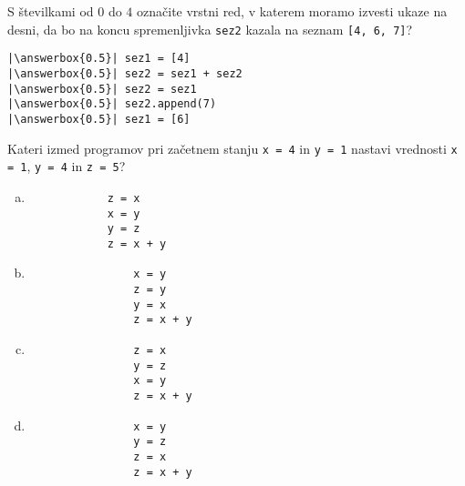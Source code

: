 \documentclass[arhiv, 10pt]{../izpit}
\newcommand{\inlinepy}[1]{\texttt{#1}}
\newcommand{\answerbox}[1]{\framebox{\vphantom{\large M}\hspace{#1cm}}}
\begin{document}
        \naloga*
        \begin{multicols}{2}
        \noindent 
        S številkami od $0$ do $4$ označite vrstni red, v katerem moramo izvesti ukaze na desni, da bo na koncu spremenljivka \inlinepy{sez2} kazala na seznam \inlinepy{[4, 6, 7]}?
    
        \columnbreak
        \noindent
        \begin{verbatim}
|\answerbox{0.5}| sez1 = [4]
|\answerbox{0.5}| sez2 = sez1 + sez2
|\answerbox{0.5}| sez2 = sez1
|\answerbox{0.5}| sez2.append(7)
|\answerbox{0.5}| sez1 = [6]

        \end{verbatim}
        \end{multicols}
    
            
        \naloga*
        
        Kateri izmed programov pri začetnem stanju
            \inlinepy{x = 4} in
            \inlinepy{y = 1}
        nastavi vrednosti
            \inlinepy{x = 1},
            \inlinepy{y = 4} in
            \inlinepy{z = 5}?
    
        \begin{multicols}{4}
        \begin{enumerate}[(a)]
\item 
            \begin{verbatim}
            z = x
            x = y
            y = z
            z = x + y
            \end{verbatim}
        
\item 
                \begin{verbatim}
                x = y
                z = y
                y = x
                z = x + y
                \end{verbatim}
            
\item 
                \begin{verbatim}
                z = x
                y = z
                x = y
                z = x + y
                \end{verbatim}
            
\item 
                \begin{verbatim}
                x = y
                y = z
                z = x
                z = x + y
                \end{verbatim}
            
\end{enumerate}

        \end{multicols}
    
\end{document}
